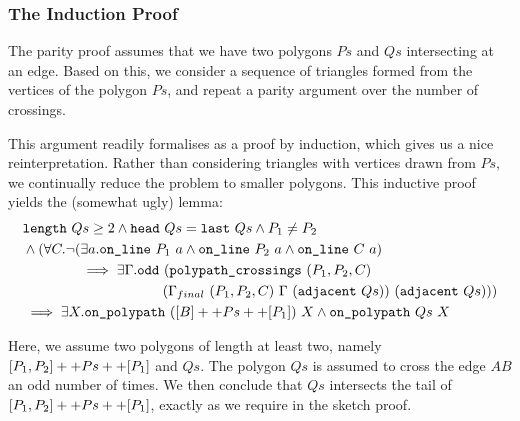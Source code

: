 \subsubsection{The Induction Proof}\label{sec:InductionProof}
The parity proof assumes that we have two polygons $Ps$ and $Qs$ intersecting at an edge. Based on this, we consider a sequence of triangles formed from the vertices of the polygon $Ps$, and repeat a parity argument over the number of crossings.

This argument readily formalises as a proof by induction, which gives us a nice reinterpretation. Rather than considering triangles with vertices drawn from $Ps$, we continually reduce the problem to smaller polygons. This inductive proof yields the (somewhat ugly) lemma:
\begin{equation}\label{eq:oddCrossClosedPolypath}
  \begin{aligned}
    &\texttt{length}\ Qs \geq 2 \wedge \texttt{head}\ Qs = \texttt{last}\ Qs\wedge P_1\neq P_2\\
    &\wedge (\forall C. \neg(\exists a.\texttt{on\_line}\ P_1\ a\wedge \texttt{on\_line}\ P_2\ a\wedge \texttt{on\_line}\ C\ a)\\
    &\qquad\qquad \implies \exists \Gamma. \texttt{odd}\ (\texttt{polypath\_crossings}\ (P_1,P_2,C)\\
    &\qquad\qquad\qquad\qquad\qquad(\Gamma_{final}\ (P_1,P_2,C)\ \Gamma\ (\texttt{adjacent}\ Qs))\ (\texttt{adjacent}\ Qs)))\\
    &\implies\exists X. \texttt{on\_polypath}\ ([B] ++ Ps ++ [P_1])\ X \wedge \texttt{on\_polypath}\ Qs\ X
  \end{aligned}
\end{equation}

Here, we assume two polygons of length at least two, namely $[P_1,P_2] ++ Ps ++ [P_1]$ and $Qs$. The polygon $Qs$ is assumed to cross the edge $AB$ an odd number of times. We then conclude that $Qs$ intersects the tail of $[P_1,P_2] ++ Ps ++ [P_1]$, exactly as we require in the sketch proof.

